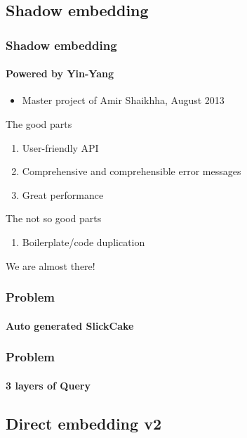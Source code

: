 \documentclass[xcolor=dvipsnames]{beamer}
\theoremstyle{definition}
\begin{document}
\subsection{Shadow embedding} %
\label{sub:Shadowembedding}
\begin{frame}[fragile]
    \frametitle{Shadow embedding}
    \framesubtitle{Powered by Yin-Yang}
    \begin{itemize}
        \item Master project of Amir Shaikhha, August 2013
    \end{itemize}
    \begin{block}{The good parts}
        \begin{enumerate}
            \item User-friendly API
            \item Comprehensive and comprehensible error messages
            \item Great performance
        \end{enumerate}
    \end{block}
    \begin{block}{The not so good parts}
        \begin{enumerate}
            \item Boilerplate/code duplication
        \end{enumerate}
    \end{block}
     {
        \vspace{0.5cm}
    }
     {
        We are almost there!
    }
\end{frame}

\begin{frame}[fragile]
    \frametitle{Problem}
    \framesubtitle{Auto generated SlickCake}
    \begin{block}{}
        
    \end{block}
\end{frame}

\begin{frame}[fragile]
    \frametitle{Problem}
    \framesubtitle{3 layers of Query}
    \begin{block}{}
        
    \end{block}
\end{frame}


\subsection{Direct embedding v2} %
\label{sub:Direct embedding}
\end{document}

